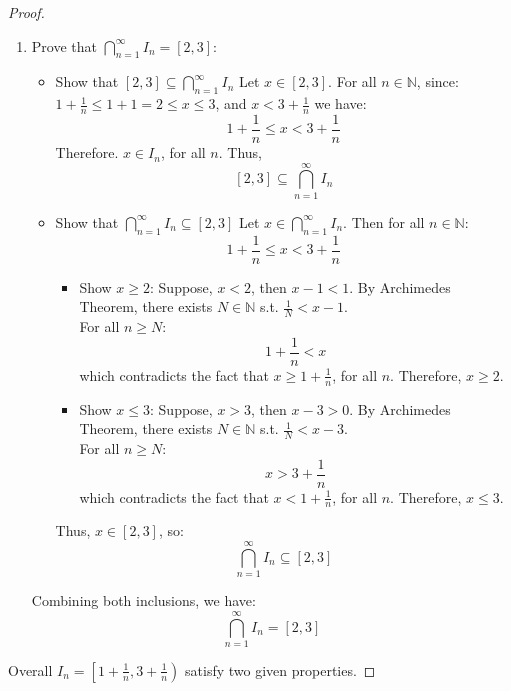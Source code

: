 \documentclass{article}
\begin{document}
\begin{proof}
\begin{enumerate}
    \item Prove that \( \bigcap_{n=1}^{\infty} I_n = [2, 3] \):
    \begin{itemize}
        \item Show that $[2, 3] \subseteq \bigcap_{n=1}^{\infty} I_n$
        Let $x \in [2, 3]$. For all $n \in \mathbb{N}$, since:
        \( 1 + \frac{1}{n} \leq 1 + 1 = 2 \leq x \leq 3 \), and \( x < 3 + \frac{1}{n} \)
        we have:
        \[ 1 + \frac{1}{n} \leq x < 3 + \frac{1}{n} \]
        Therefore. $x \in I_n$, for all $n$. Thus,
        \[ [2, 3] \subseteq \bigcap_{n=1}^{\infty} I_n \]
        \item Show that $ \bigcap_{n=1}^{\infty} I_n \subseteq [2, 3] $
        Let $x \in \bigcap_{n=1}^{\infty} I_n$. Then for all $n \in \mathbb{N}$:
        \[ 1 + \frac{1}{n} \leq x < 3 + \frac{1}{n} \]
        \begin{itemize}
            \item Show $x \geq 2$:
            Suppose, $x < 2$, then $x - 1 < 1$. By Archimedes Theorem, there exists $N \in \mathbb{N}$ s.t. $\frac{1}{N} < x - 1$.
            \\
            For all $n \geq N$:
            \[ 1 + \frac{1}{n} < x \]
            which contradicts the fact that $x \geq 1 + \frac{1}{n}$, for all $n$. Therefore, $x \geq 2$.
            \item Show $x \leq 3$:
            Suppose, $x > 3$, then $x - 3 > 0$. By Archimedes Theorem, there exists $N \in \mathbb{N}$ s.t. $\frac{1}{N} < x - 3$.
            \\
            For all $n \geq N$:
            \[ x > 3 + \frac{1}{n} \]
            which contradicts the fact that $x < 1 + \frac{1}{n}$, for all $n$. Therefore, $x \leq 3$.
        \end{itemize}
        Thus, $x \in [2, 3]$, so:
        \[ \bigcap_{n=1}^{\infty} I_n \subseteq [2, 3] \]
    \end{itemize}
    Combining both inclusions, we have:
    \[ \bigcap_{n=1}^{\infty} I_n = [2, 3] \]
\end{enumerate}
Overall \( I_n = \left[ 1 + \frac{1}{n}, 3 + \frac{1}{n} \right) \) satisfy two given properties.

\end{proof}
\end{document}
